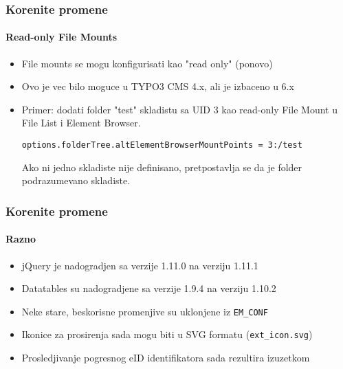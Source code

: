 
\begin{frame}[fragile]
	\frametitle{Korenite promene}
	\framesubtitle{Read-only File Mounts}

	\begin{itemize}

		\item File mounts se mogu konfigurisati kao "read only" (ponovo)
		\item Ovo je vec bilo moguce u  TYPO3 CMS 4.x, ali je izbaceno u 6.x
		\item Primer: dodati folder "test" skladistu sa UID 3 kao read-only File Mount u File List i Element Browser.\newline

			\smaller\texttt{options.folderTree.altElementBrowserMountPoints = 3:/test}\normalsize\newline

			Ako ni jedno skladiste nije definisano, pretpostavlja se da je folder podrazumevano skladiste.
	\end{itemize}

\end{frame}


\begin{frame}[fragile]
	\frametitle{Korenite promene}
	\framesubtitle{Razno}

	\begin{itemize}
		\item jQuery je nadogradjen sa verzije 1.11.0 na verziju 1.11.1
		\item Datatables su nadogradjene sa verzije 1.9.4 na verziju 1.10.2
		\item Neke stare, beskorisne promenjive su uklonjene iz \texttt{EM\_CONF}
		\item Ikonice za prosirenja sada mogu biti u SVG formatu (\texttt{ext\_icon.svg})
		\item Prosledjivanje pogresnog eID identifikatora sada rezultira izuzetkom
	\end{itemize}

\end{frame}

